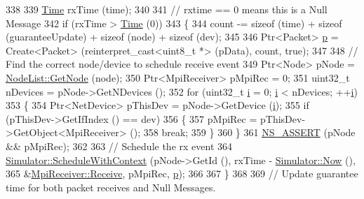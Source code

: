\begin{DoxyCode}
338 
339           \hyperlink{namespacens3_1_1TracedValueCallback_a7ffd3e7c142ffe7c8a1d2db9b8de38ec}{Time} rxTime (time);
340 
341           \textcolor{comment}{// rxtime == 0 means this is a Null Message}
342           \textcolor{keywordflow}{if} (rxTime > \hyperlink{namespacens3_1_1TracedValueCallback_a7ffd3e7c142ffe7c8a1d2db9b8de38ec}{Time} (0))
343             \{
344               count -= \textcolor{keyword}{sizeof} (time) + \textcolor{keyword}{sizeof} (guaranteeUpdate) + \textcolor{keyword}{sizeof} (node) + \textcolor{keyword}{sizeof} (dev);
345 
346               Ptr<Packet> \hyperlink{lte__link__budget_8m_ac9de518908a968428863f829398a4e62}{p} = Create<Packet> (\textcolor{keyword}{reinterpret\_cast<}uint8\_t *\textcolor{keyword}{>} (pData), count, \textcolor{keyword}{true});
347 
348               \textcolor{comment}{// Find the correct node/device to schedule receive event}
349               Ptr<Node> pNode = \hyperlink{classns3_1_1NodeList_a80ac09977d48d29db5c704ac8483cf6c}{NodeList::GetNode} (node);
350               Ptr<MpiReceiver> pMpiRec = 0;
351               uint32\_t nDevices = pNode->GetNDevices ();
352               \textcolor{keywordflow}{for} (uint32\_t \hyperlink{bernuolliDistribution_8m_a6f6ccfcf58b31cb6412107d9d5281426}{i} = 0; \hyperlink{bernuolliDistribution_8m_a6f6ccfcf58b31cb6412107d9d5281426}{i} < nDevices; ++\hyperlink{bernuolliDistribution_8m_a6f6ccfcf58b31cb6412107d9d5281426}{i})
353                 \{
354                   Ptr<NetDevice> pThisDev = pNode->GetDevice (\hyperlink{bernuolliDistribution_8m_a6f6ccfcf58b31cb6412107d9d5281426}{i});
355                   \textcolor{keywordflow}{if} (pThisDev->GetIfIndex () == dev)
356                     \{
357                       pMpiRec = pThisDev->GetObject<MpiReceiver> ();
358                       \textcolor{keywordflow}{break};
359                     \}
360                 \}
361               \hyperlink{assert_8h_a6dccdb0de9b252f60088ce281c49d052}{NS\_ASSERT} (pNode && pMpiRec);
362 
363               \textcolor{comment}{// Schedule the rx event}
364               \hyperlink{classns3_1_1Simulator_a86dbaef45a15a42365d7d2ae550449f6}{Simulator::ScheduleWithContext} (pNode->GetId (), rxTime - 
      \hyperlink{classns3_1_1Simulator_ac3178fa975b419f7875e7105be122800}{Simulator::Now} (),
365                                               &\hyperlink{classns3_1_1MpiReceiver_a5c5506ca706198f61eaa2e550eca7ff3}{MpiReceiver::Receive}, pMpiRec, 
      \hyperlink{lte__link__budget_8m_ac9de518908a968428863f829398a4e62}{p});
366 
367             \}
368 
369           \textcolor{comment}{// Update guarantee time for both packet receives and Null Messages.}

\end{DoxyCode}
